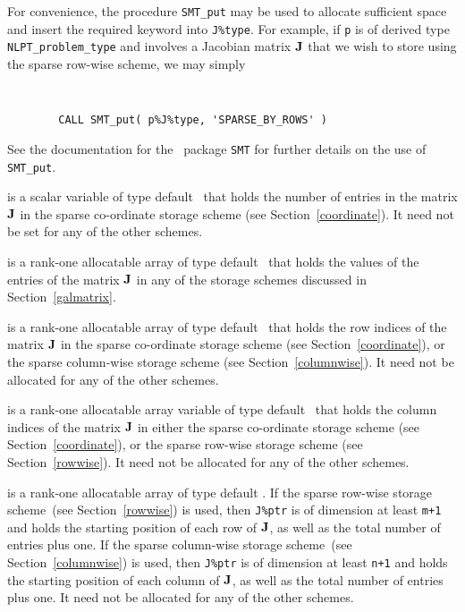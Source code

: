 \documentclass{galahad}
\begin{document}
\begin{description}
\begin{description}
For convenience, the procedure {\tt SMT\_put} may be used to allocate
sufficient space and insert the required keyword into {\tt J\%type}.
For example, if {\tt p} is of derived type {\tt NLPT\_problem\_type}
and involves a Jacobian matrix ${\mathbf{J}}$ that we wish to store using
the sparse row-wise scheme, we may simply
{\tt 
\begin{verbatim}
        CALL SMT_put( p%J%type, 'SPARSE_BY_ROWS' )
\end{verbatim}
}
\noindent
See the documentation for the \galahad\ package {\tt SMT} 
for further details on the use of {\tt SMT\_put}.

 is a scalar variable of type default \integer\ that holds
the number of entries in the matrix ${\mathbf{J}}$ in the sparse co-ordinate
storage scheme (see Section~\ref{coordinate}).  It need not be set for
any of the other schemes.

 is a rank-one allocatable array of type default \realdp\ that holds
the values of the entries of the matrix ${\mathbf{J}}$ in any of the 
storage schemes discussed in Section~\ref{galmatrix}.

 is a rank-one allocatable array of type default \integer\
that holds the row indices of the matrix ${\mathbf{J}}$ in the sparse
co-ordinate storage scheme (see Section~\ref{coordinate}), or the
sparse column-wise storage scheme (see Section~\ref{columnwise}).  It
need not be allocated for any of the other schemes.

 is a rank-one allocatable array variable of type default
\integer\ that holds the column indices of the matrix ${\mathbf{J}}$ in
either the sparse co-ordinate storage scheme (see Section~\ref{coordinate}), or the
sparse row-wise storage scheme (see Section~\ref{rowwise}).  It need
not be allocated for any of the other schemes.

 is a rank-one allocatable array of type default
\integer.  If the sparse row-wise storage scheme~(see Section~\ref{rowwise})
is used, then {\tt J\%ptr} is of dimension at least {\tt m+1} and holds the
starting position of each row of ${\mathbf{J}}$, as well as the total number
of entries plus one.  If the sparse column-wise storage scheme~(see
Section~\ref{columnwise}) is used, then {\tt J\%ptr} is of dimension
at least {\tt n+1} and holds the starting position of each column of ${\mathbf{J}}$, as well as
the total number of entries plus one.  It need not be allocated for
any of the other schemes.


\end{description}
\end{description}
\end{document}
